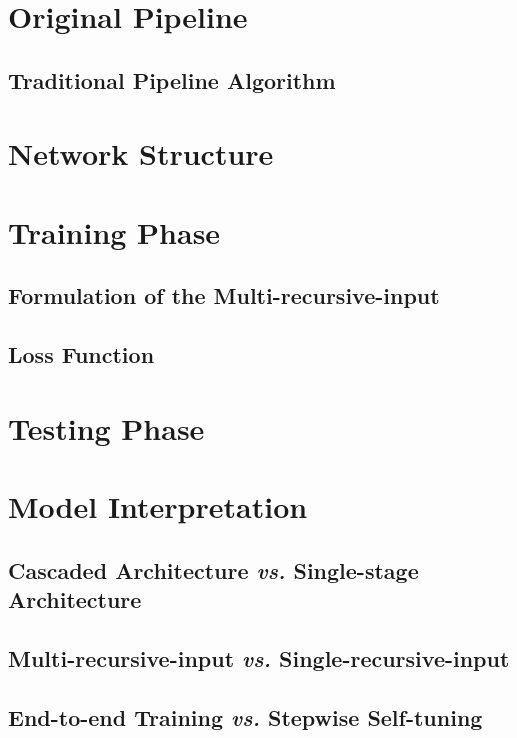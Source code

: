 \documentclass[senior]{IPSstyle}
\begin{document}
\section{Original Pipeline}
\subsection{Traditional Pipeline Algorithm}


\section{Network Structure} \label{network structure}
\section{Training Phase} \label{training phase}
\subsection{Formulation of the Multi-recursive-input}


\subsection{Loss Function}



\section{Testing Phase} \label{testing phase}


\section{Model Interpretation} \label{interpretation}
\subsection{Cascaded Architecture \emph{vs.} Single-stage Architecture}

\subsection{Multi-recursive-input \emph{vs.} Single-recursive-input}


\subsection{End-to-end Training \emph{vs.} Stepwise Self-tuning}
\end{document}
